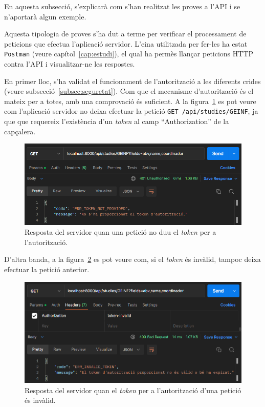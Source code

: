 \documentclass[a4paper,12pt]{ThesisStyle}
\begin{document}
En aquesta subsecció, s'explicarà com s'han realitzat les proves a l'API i se n'aportarà algun exemple.

Aquesta tipologia de proves s'ha dut a terme per verificar el processament de peticions que efectua l'aplicació servidor. L'eina utilitzada per fer-les ha estat \texttt{Postman} (veure capítol~\ref{cap:estudi}), el qual ha permès llançar peticions HTTP contra l'API i visualitzar-ne les respostes.

En primer lloc, s'ha validat el funcionament de l'autorització a les diferents crides (veure subsecció~\ref{subsec:seguretat}). Com que el mecanisme d'autorització és el mateix per a totes, amb una comprovació és suficient. A la figura~\ref{img:no_token} es pot veure com l'aplicació servidor no deixa efectuar la petició \texttt{GET /api/studies/GEINF}, ja que que requereix l'existència d'un \textit{token} al camp ``Authorization'' de la capçalera.

\begin{figure}[H]
  \centering
  \includegraphics[width=\textwidth]{assets/proves/noToken.png}
  \caption{\label{img:no_token} Resposta del servidor quan una petició no duu el \textit{token} per a l'autorització.}
\end{figure}

D'altra banda, a la figura~\ref{img:invalidToken} es pot veure com, si el \textit{token} és invàlid, tampoc deixa efectuar la petició anterior.

\newpage

\begin{figure}[H]
  \centering
  \includegraphics[width=\textwidth]{assets/proves/invalidToken.png}
  \caption{\label{img:invalidToken} Resposta del servidor quan el \textit{token} per a l'autorització d'una petició és invàlid.}
\end{figure}
\end{document}
